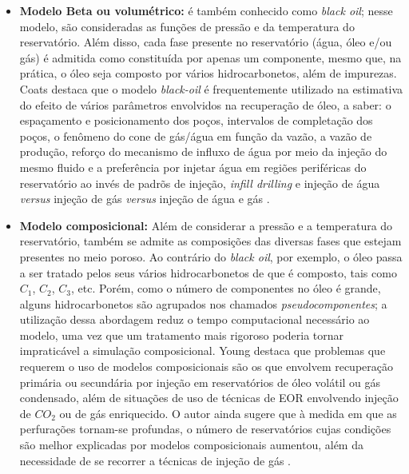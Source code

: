 \begin{itemize}
	\item \textbf{Modelo Beta ou volum\'{e}trico:} \'{e} tamb\'{e}m conhecido como \textit{black oil}; nesse modelo, s\~{a}o consideradas as fun\c{c}\~{o}es de press\~{a}o e da temperatura do reservat\'{o}rio. Al\'{e}m disso, cada fase presente no reservat\'{o}rio (\'{a}gua, \'{o}leo e/ou g\'{a}s) \'{e} admitida como constitu\'{i}da por apenas um componente, mesmo que, na pr\'{a}tica, o \'{o}leo seja composto por v\'{a}rios hidrocarbonetos, al\'{e}m de impurezas. Coats destaca que o modelo \textit{black-oil} é frequentemente utilizado na estimativa do efeito de vários parâmetros envolvidos na recuperação de óleo, a saber: o espaçamento e posicionamento dos poços, intervalos de completação dos poços, o fenômeno do cone de gás/água em função da vazão, a vazão de produção, reforço do mecanismo de influxo de água por meio da injeção do mesmo fluido e a preferência por injetar água em regiões periféricas do reservatório ao invés de padrõs de injeção, \textit{infill drilling} e injeção de água \textit{versus} injeção de gás \textit{versus} injeção de água e gás \cite{coats1982}. 
	\item \textbf{Modelo composicional:} Al\'{e}m de considerar a press\~{a}o e a temperatura do reservat\'{o}rio, tamb\'{e}m se admite as composi\c{c}\~{o}es das diversas fases que estejam presentes no meio poroso. Ao contr\'{a}rio do \textit{black oil}, por exemplo, o \'{o}leo passa a ser tratado pelos seus v\'{a}rios hidrocarbonetos de que \'{e} composto, tais como $C_1$, $C_2$, $C_3$, etc. Por\'{e}m, como o n\'{u}mero de componentes no \'{o}leo \'{e} grande, alguns hidrocarbonetos s\~{a}o agrupados nos chamados \textit{pseudocomponentes}; a utiliza\c{c}\~{a}o dessa abordagem reduz o tempo computacional necess\'{a}rio ao modelo, uma vez que um tratamento mais rigoroso poderia tornar impratic\'{a}vel a simula\c{c}\~{a}o composicional. Young destaca que problemas que requerem o uso de modelos composicionais são os que envolvem recuperação primária ou secundária por injeção em reservatórios de óleo volátil ou gás condensado, além de situações de uso de técnicas de EOR envolvendo injeção de $CO_2$ ou de gás enriquecido. O autor ainda sugere que à medida em que as perfurações tornam-se profundas, o número de reservatórios cujas condições são melhor explicadas por modelos composicionais aumentou, além da necessidade de se recorrer a técnicas de injeção de gás \cite{young1983}. 

\end{itemize}
